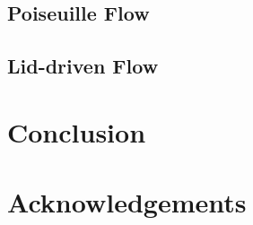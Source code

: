 \documentclass{article}
\begin{document}
\subsection{Poiseuille Flow}

\subsection{Lid-driven Flow}

\section{Conclusion}

\section*{Acknowledgements}



	
\end{document}
